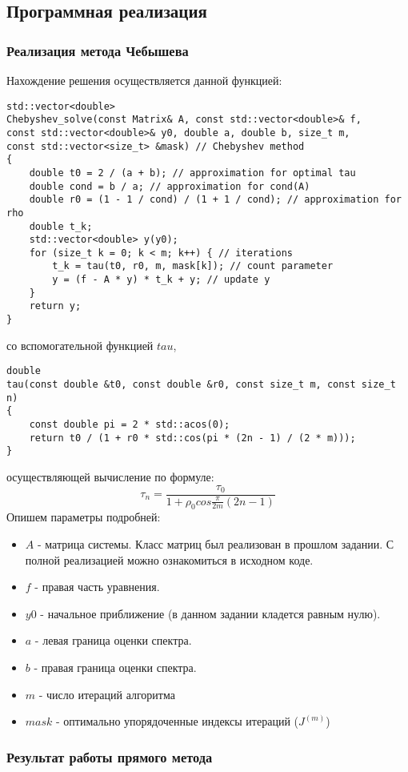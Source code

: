 \documentclass[a4paper,12pt,titlepage,final]{article}
\begin{document}
\subsection{Программная реализация}
\subsubsection{Реализация метода Чебышева}
Нахождение решения осуществляется данной функцией: 
\begin{verbatim}
std::vector<double>
Chebyshev_solve(const Matrix& A, const std::vector<double>& f,
const std::vector<double>& y0, double a, double b, size_t m, 
const std::vector<size_t> &mask) // Chebyshev method
{
    double t0 = 2 / (a + b); // approximation for optimal tau
    double cond = b / a; // approximation for cond(A)
    double r0 = (1 - 1 / cond) / (1 + 1 / cond); // approximation for rho 
    double t_k;
    std::vector<double> y(y0);
    for (size_t k = 0; k < m; k++) { // iterations
        t_k = tau(t0, r0, m, mask[k]); // count parameter
        y = (f - A * y) * t_k + y; // update y
    }
    return y;
}
\end{verbatim}
со вспомогательной функцией $tau$,
\begin{verbatim}
double
tau(const double &t0, const double &r0, const size_t m, const size_t n)
{
    const double pi = 2 * std::acos(0);
    return t0 / (1 + r0 * std::cos(pi * (2n - 1) / (2 * m)));
}
\end{verbatim}
осуществляющей вычисление по формуле:
$$\tau_n = \frac{\tau_0}{1 + \rho_0cos\frac{\pi}{2m}(2n-1)}$$
Опишем параметры подробней:
\begin{itemize}
    \item $A$ - матрица системы. Класс матриц был реализован в прошлом задании. С полной реализацией можно ознакомиться в исходном коде.
    \item $f$ - правая часть уравнения.
    \item $y0$ - начальное приближение (в данном задании кладется равным нулю).
    \item $a$ - левая граница оценки спектра.
    \item $b$ - правая граница оценки спектра.
    \item $m$ - число итераций алгоритма
    \item $mask$ - оптимально упорядоченные индексы итераций ($J^{(m)}$)
\end{itemize}
\subsubsection{Результат работы прямого метода}
\end{document}

